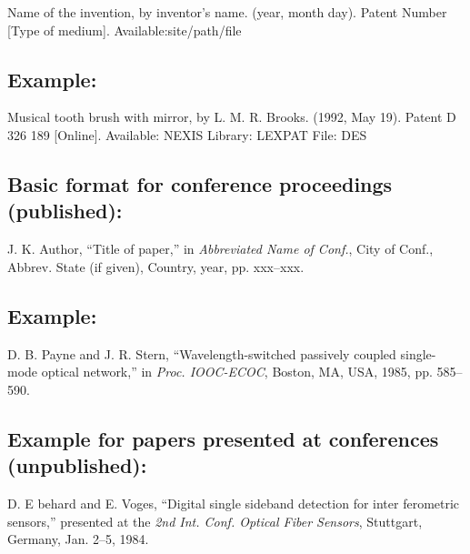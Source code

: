 \documentclass[journal]{IEEEtran}
\begin{document}
Name of the invention, by inventor’s name. (year, month day). Patent Number [Type of medium]. Available:site/path/file

\subsection*{Example:}

\begin{thebibliography}{34}
\setcounter{enumiv}{20}

\bibitem{}Musical tooth brush with mirror, by L. M. R. Brooks. (1992, May 19). Patent D 326 189
[Online]. Available: NEXIS Library: LEXPAT File:   DES 

\end{thebibliography}

\subsection*{Basic format for conference proceedings (published):}

J. K. Author, ``Title of paper,'' in {\em Abbreviated Name of Conf.}, City of Conf., Abbrev. State (if given), Country, year, pp. xxx--xxx.

\subsection*{Example:}

\begin{thebibliography}{34}
\setcounter{enumiv}{21}

\bibitem{}D. B. Payne and J. R. Stern, ``Wavelength-switched passively coupled single-mode optical network,'' in {\em Proc. IOOC-ECOC}, Boston, MA, USA, 1985,
pp. 585--590.

\end{thebibliography}

\subsection*{Example for papers presented at conferences (unpublished):}

\begin{thebibliography}{34}
\setcounter{enumiv}{22}

\bibitem{}D. E behard and E. Voges, ``Digital single sideband detection for inter ferometric sensors,'' presented at the {\em 2nd Int. Conf. Optical Fiber Sensors}, Stuttgart, Germany, Jan. 2--5, 1984.
\end{thebibliography}
\end{document}

